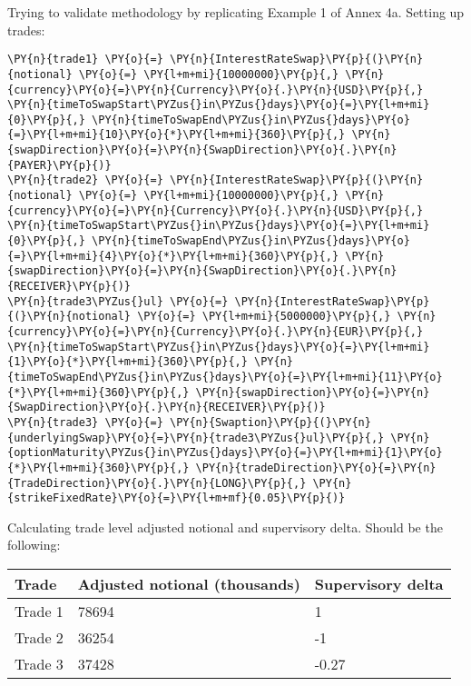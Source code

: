     Trying to validate methodology by replicating Example 1 of Annex 4a.
Setting up trades:

    \begin{tcolorbox}[breakable, size=fbox, boxrule=1pt, pad at break*=1mm,colback=cellbackground, colframe=cellborder]
\begin{Verbatim}[commandchars=\\\{\}]
\PY{n}{trade1} \PY{o}{=} \PY{n}{InterestRateSwap}\PY{p}{(}\PY{n}{notional} \PY{o}{=} \PY{l+m+mi}{10000000}\PY{p}{,} \PY{n}{currency}\PY{o}{=}\PY{n}{Currency}\PY{o}{.}\PY{n}{USD}\PY{p}{,} \PY{n}{timeToSwapStart\PYZus{}in\PYZus{}days}\PY{o}{=}\PY{l+m+mi}{0}\PY{p}{,} \PY{n}{timeToSwapEnd\PYZus{}in\PYZus{}days}\PY{o}{=}\PY{l+m+mi}{10}\PY{o}{*}\PY{l+m+mi}{360}\PY{p}{,} \PY{n}{swapDirection}\PY{o}{=}\PY{n}{SwapDirection}\PY{o}{.}\PY{n}{PAYER}\PY{p}{)}
\PY{n}{trade2} \PY{o}{=} \PY{n}{InterestRateSwap}\PY{p}{(}\PY{n}{notional} \PY{o}{=} \PY{l+m+mi}{10000000}\PY{p}{,} \PY{n}{currency}\PY{o}{=}\PY{n}{Currency}\PY{o}{.}\PY{n}{USD}\PY{p}{,} \PY{n}{timeToSwapStart\PYZus{}in\PYZus{}days}\PY{o}{=}\PY{l+m+mi}{0}\PY{p}{,} \PY{n}{timeToSwapEnd\PYZus{}in\PYZus{}days}\PY{o}{=}\PY{l+m+mi}{4}\PY{o}{*}\PY{l+m+mi}{360}\PY{p}{,} \PY{n}{swapDirection}\PY{o}{=}\PY{n}{SwapDirection}\PY{o}{.}\PY{n}{RECEIVER}\PY{p}{)}
\PY{n}{trade3\PYZus{}ul} \PY{o}{=} \PY{n}{InterestRateSwap}\PY{p}{(}\PY{n}{notional} \PY{o}{=} \PY{l+m+mi}{5000000}\PY{p}{,} \PY{n}{currency}\PY{o}{=}\PY{n}{Currency}\PY{o}{.}\PY{n}{EUR}\PY{p}{,} \PY{n}{timeToSwapStart\PYZus{}in\PYZus{}days}\PY{o}{=}\PY{l+m+mi}{1}\PY{o}{*}\PY{l+m+mi}{360}\PY{p}{,} \PY{n}{timeToSwapEnd\PYZus{}in\PYZus{}days}\PY{o}{=}\PY{l+m+mi}{11}\PY{o}{*}\PY{l+m+mi}{360}\PY{p}{,} \PY{n}{swapDirection}\PY{o}{=}\PY{n}{SwapDirection}\PY{o}{.}\PY{n}{RECEIVER}\PY{p}{)}
\PY{n}{trade3} \PY{o}{=} \PY{n}{Swaption}\PY{p}{(}\PY{n}{underlyingSwap}\PY{o}{=}\PY{n}{trade3\PYZus{}ul}\PY{p}{,} \PY{n}{optionMaturity\PYZus{}in\PYZus{}days}\PY{o}{=}\PY{l+m+mi}{1}\PY{o}{*}\PY{l+m+mi}{360}\PY{p}{,} \PY{n}{tradeDirection}\PY{o}{=}\PY{n}{TradeDirection}\PY{o}{.}\PY{n}{LONG}\PY{p}{,} \PY{n}{strikeFixedRate}\PY{o}{=}\PY{l+m+mf}{0.05}\PY{p}{)}
\end{Verbatim}
\end{tcolorbox}

    Calculating trade level adjusted notional and supervisory delta. Should
be the following:

\begin{longtable}[]{@{}lll@{}}
\toprule
Trade & Adjusted notional (thousands) & Supervisory delta\tabularnewline
\midrule
\endhead
Trade 1 & 78694 & 1\tabularnewline
Trade 2 & 36254 & -1\tabularnewline
Trade 3 & 37428 & -0.27\tabularnewline
\bottomrule
\end{longtable}

